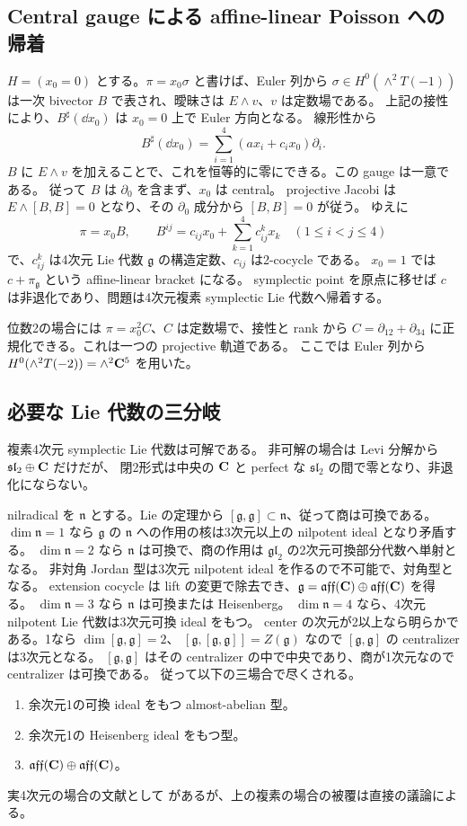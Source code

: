 \documentclass[11pt,a4paper]{ltjsarticle}
\newcommand{\g}{\mathfrak g}\newcommand{\n}{\mathfrak n}
\theoremstyle{remark}\newtheorem{remark}[theorem]{注意}\renewcommand{\proofname}{証明}
\begin{document}
\subsection{Central gauge による affine-linear Poisson への帰着}
$H=(x_0=0)$ とする。$\pi=x_0\sigma$ と書けば、Euler 列から
$\sigma\in H^0(\wedge^2T(-1))$ は一次 bivector $B$ で表され、曖昧さは $E\wedge v$、$v$ は定数場である。
上記の接性により、$B^\sharp(\dd x_0)$ は $x_0=0$ 上で Euler 方向となる。
線形性から
\[
 B^\sharp(\dd x_0)=\sum_{i=1}^4(a x_i+c_i x_0)\partial_i.
\]
$B$ に $E\wedge v$ を加えることで、これを恒等的に零にできる。この gauge は一意である。
従って $B$ は $\partial_0$ を含まず、$x_0$ は central。
projective Jacobi は $E\wedge[B,B]=0$ となり、その $\partial_0$ 成分から $[B,B]=0$ が従う。
ゆえに
\[
 \pi=x_0B,\qquad
 B^{ij}=c_{ij}x_0+\sum_{k=1}^4c_{ij}^{k}x_k\quad(1\le i<j\le4)
\]
で、$c_{ij}^{k}$ は4次元 Lie 代数 $\g$ の構造定数、$c_{ij}$ は2-cocycle である。
$x_0=1$ では $c+\pi_\g$ という affine-linear bracket になる。
symplectic point を原点に移せば $c$ は非退化であり、問題は4次元複素 symplectic Lie 代数へ帰着する。

位数2の場合には $\pi=x_0^2C$、$C$ は定数場で、接性と rank から
$C=\partial_{12}+\partial_{34}$ に正規化できる。これは一つの projective 軌道である。
ここでは Euler 列から $H^0(\wedge^2T(-2))=\wedge^2\mathbf C^5$ を用いた。

\subsection{必要な Lie 代数の三分岐}
複素4次元 symplectic Lie 代数は可解である。
非可解の場合は Levi 分解から $\mathfrak{sl}_2\oplus\mathbf C$ だけだが、
閉2形式は中央の $\mathbf C$ と perfect な $\mathfrak{sl}_2$ の間で零となり、非退化にならない。

nilradical を $\n$ とする。Lie の定理から $[\g,\g]\subset\n$、従って商は可換である。
$\dim\n=1$ なら $\g$ の $\n$ への作用の核は3次元以上の nilpotent ideal となり矛盾する。
$\dim\n=2$ なら $\n$ は可換で、商の作用は $\mathfrak{gl}_2$ の2次元可換部分代数へ単射となる。
非対角 Jordan 型は3次元 nilpotent ideal を作るので不可能で、対角型となる。
extension cocycle は lift の変更で除去でき、$\g=\mathfrak{aff}(\CC)\oplus\mathfrak{aff}(\CC)$ を得る。
$\dim\n=3$ なら $\n$ は可換または Heisenberg。
$\dim\n=4$ なら、4次元 nilpotent Lie 代数は3次元可換 ideal をもつ。
center の次元が2以上なら明らかである。1なら $\dim[\g,\g]=2$、
$[\g,[\g,\g]]=Z(\g)$ なので $[\g,\g]$ の centralizer は3次元となる。
$[\g,\g]$ はその centralizer の中で中央であり、商が1次元なので centralizer は可換である。
従って以下の三場合で尽くされる。
\begin{enumerate}
 \item 余次元1の可換 ideal をもつ almost-abelian 型。
 \item 余次元1の Heisenberg ideal をもつ型。
 \item $\mathfrak{aff}(\mathbf C)\oplus\mathfrak{aff}(\mathbf C)$。
\end{enumerate}
実4次元の場合の文献として \cite{Ovando} があるが、上の複素の場合の被覆は直接の議論による。
\end{document}
